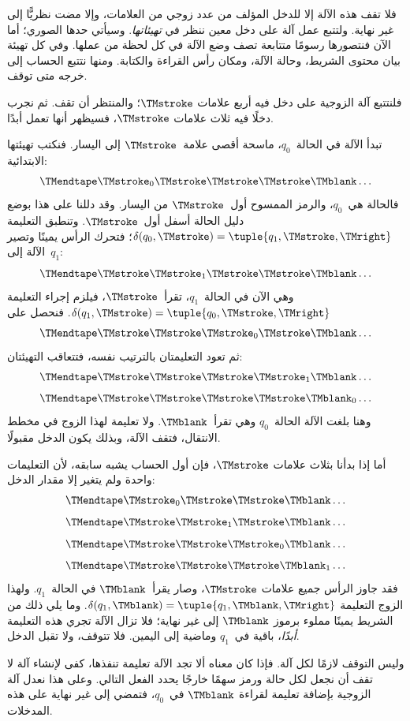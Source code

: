 \documentclass[../../../include/open-logic-section]{subfiles}
\begin{document}
\begin{explain}
فلا تقف هذه الآلة إلا للدخل المؤلف من عدد زوجي من العلامات، وإلا مضت نظريًّا إلى غير نهاية. ولتتبع عمل آلة على دخل معين ننظر في \emph{تهيئاتها}. وسيأتي حدها الصوري؛ أما الآن فنتصورها رسومًا متتابعة تصف وضع الآلة في كل لحظة من عملها. وفي كل تهيئة بيان محتوى الشريط، وحالة الآلة، ومكان رأس القراءة والكتابة. ومنها نتتبع الحساب إلى خرجه متى توقف.

فلنتتبع آلة الزوجية على دخل فيه أربع علامات $\TMstroke$؛ والمنتظر أن تقف. ثم نجرب دخلًا فيه ثلاث علامات $\TMstroke$، فسيظهر أنها تعمل أبدًا.

تبدأ الآلة في الحالة~$q_0$، ماسحة أقصى علامة~$\TMstroke$ إلى اليسار. فنكتب تهيئتها الابتدائية:
\[
\TMendtape \TMstroke_0 \TMstroke \TMstroke \TMstroke \TMblank \ldots
\]
فالحالة هي~$q_0$، والرمز الممسوح أول~$\TMstroke$ من اليسار. وقد دللنا على هذا بوضع دليل الحالة أسفل أول~$\TMstroke$. وتنطبق التعليمة $\delta(q_0,\TMstroke)=\tuple{q_1,\TMstroke,\TMright}$؛ فتحرك الرأس يمينًا وتصير الآلة إلى~$q_1$:
\[
\TMendtape \TMstroke \TMstroke_1 \TMstroke \TMstroke \TMblank \ldots
\]
وهي الآن في الحالة~$q_1$، تقرأ~$\TMstroke$، فيلزم إجراء التعليمة $\delta(q_1,\TMstroke)=\tuple{q_0,
  \TMstroke,\TMright}$. فنحصل على
\[
\TMendtape \TMstroke \TMstroke \TMstroke_0 \TMstroke \TMblank \ldots
\]
ثم تعود التعليمتان بالترتيب نفسه، فتتعاقب التهيئتان:
\[
\TMendtape \TMstroke \TMstroke \TMstroke \TMstroke_1 \TMblank \ldots
\]
\[
\TMendtape \TMstroke \TMstroke \TMstroke \TMstroke \TMblank_0 \ldots
\]
وهنا بلغت الآلة الحالة~$q_0$ وهي تقرأ~$\TMblank$. ولا تعليمة لهذا الزوج في مخطط الانتقال، فتقف الآلة، وبذلك يكون الدخل مقبولًا.

أما إذا بدأنا بثلاث علامات $\TMstroke$، فإن أول الحساب يشبه سابقه، لأن التعليمات واحدة ولم يتغير إلا مقدار الدخل:
\[
\TMendtape \TMstroke_0 \TMstroke \TMstroke \TMblank \ldots
\]
\[
\TMendtape \TMstroke \TMstroke_1 \TMstroke \TMblank \ldots
\]
\[
\TMendtape \TMstroke \TMstroke \TMstroke_0 \TMblank \ldots
\]
\[
\TMendtape \TMstroke \TMstroke \TMstroke \TMblank_1 \ldots
\]
فقد جاوز الرأس جميع علامات $\TMstroke$، وصار يقرأ~$\TMblank$ في الحالة~$q_1$. ولهذا الزوج التعليمة $\delta(q_1,\TMblank)=\tuple{q_1,\TMblank,\TMright}$. وما يلي ذلك من الشريط يمينًا مملوء برموز $\TMblank$ إلى غير نهاية؛ فلا تزال الآلة تجري هذه التعليمة \emph{أبدًا}، باقية في~$q_1$ وماضية إلى اليمين. فلا تتوقف، ولا تقبل الدخل.
\end{explain}

\begin{explain}
وليس التوقف لازمًا لكل آلة. فإذا كان معناه ألا تجد الآلة تعليمة تنفذها، كفى لإنشاء آلة لا تقف أن نجعل لكل حالة ورمز سهمًا خارجًا يحدد الفعل التالي. وعلى هذا نعدل آلة الزوجية بإضافة تعليمة لقراءة $\TMblank$ في~$q_0$، فتمضي إلى غير نهاية على هذه المدخلات.
\end{explain}
\end{document}

